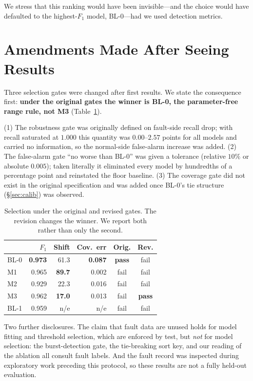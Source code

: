 \documentclass{article}
\begin{document}
We stress that this ranking would have been invisible---and the choice would
have defaulted to the highest-$F_1$ model, BL-0---had we used detection
metrics.

\section{Amendments Made After Seeing Results}
\label{sec:amend}

Three selection gates were changed after first results. We state the
consequence first: \textbf{under the original gates the winner is BL-0, the
parameter-free range rule, not M3} (Table~\ref{tab:gates}).

(1) The robustness gate was originally defined on fault-side recall drop; with
recall saturated at $1.000$ this quantity was $0.00$--$2.57$ points for all
models and carried no information, so the normal-side false-alarm increase was
added. (2) The false-alarm gate ``no worse than BL-0'' was given a tolerance
(relative $10\%$ or absolute $0.005$); taken literally it eliminated every
model by hundredths of a percentage point and reinstated the floor baseline.
(3) The coverage gate did not exist in the original specification and was added
once BL-0's tie structure (\S\ref{sec:calib}) was observed.

\begin{table}[t]
\caption{Selection under the original and revised gates. The revision changes
the winner. We report both rather than only the second.}
\label{tab:gates}
\vskip 0.08in
\centering
\small
\setlength{\tabcolsep}{3pt}
\begin{tabular}{lrrrcc}
\toprule
 & $F_1$ & Shift & Cov.\ err & Orig. & Rev. \\
\midrule
BL-0 & \textbf{0.973} & 61.3 & \textbf{0.087} & \textbf{pass} & fail \\
M1   & 0.965 & \textbf{89.7} & 0.002 & fail & fail \\
M2   & 0.929 & 22.3 & 0.016 & fail & fail \\
M3   & 0.962 & \textbf{17.0} & 0.013 & fail & \textbf{pass} \\
BL-1 & 0.959 & n/e & n/e & fail & fail \\
\bottomrule
\end{tabular}
\end{table}

Two further disclosures. The claim that fault data are unused holds for model
fitting and threshold selection, which are enforced by test, but \emph{not} for
model selection: the burst-detection gate, the tie-breaking sort key, and our
reading of the ablation all consult fault labels. And the fault record was
inspected during exploratory work preceding this protocol, so these results are
not a fully held-out evaluation.
\end{document}
